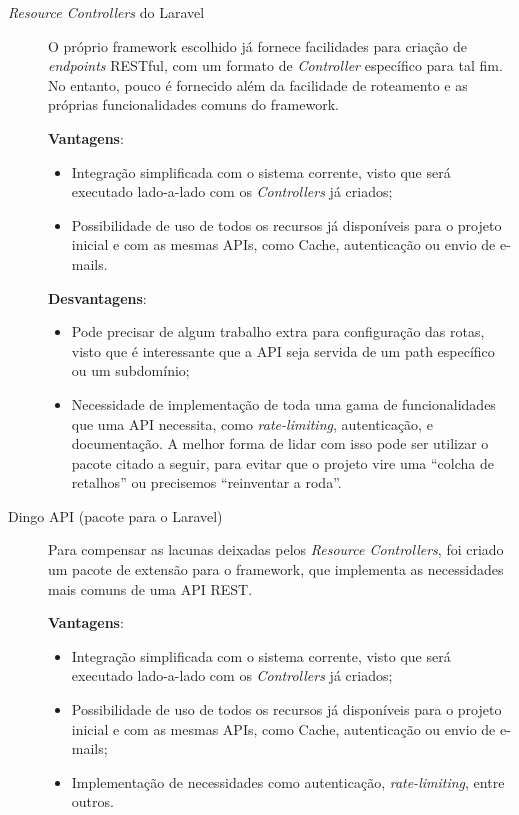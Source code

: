 \documentclass[12pt,a4paper,twoside,hyphens,english,brazil]{abntex2}
\begin{document}
{\begin{description}
	\item[\emph{Resource Controllers} do Laravel]
		O próprio framework escolhido já fornece facilidades para criação de \emph{endpoints} RESTful, com um formato de \emph{Controller} específico para tal fim. No entanto, pouco é fornecido além da facilidade de roteamento e as próprias funcionalidades comuns do framework.
		
		\textbf{Vantagens}:
		\begin{itemize}[itemsep=-1ex]
			\item Integração simplificada com o sistema corrente, visto que será executado lado-a-lado com os \emph{Controllers} já criados;
			\item Possibilidade de uso de todos os recursos já disponíveis para o projeto inicial e com as mesmas APIs, como Cache, autenticação ou envio de e-mails.
		\end{itemize}
			
		\textbf{Desvantagens}:
		\begin{itemize}[itemsep=-1ex]
			\item Pode precisar de algum trabalho extra para configuração das rotas, visto que é interessante que a API seja servida de um path específico ou um subdomínio;
			\item Necessidade de implementação de toda uma gama de funcionalidades que uma API necessita, como \emph{rate-limiting}, autenticação, e documentação. A melhor forma de lidar com isso pode ser utilizar o pacote citado a seguir, para evitar que o projeto vire uma ``colcha de retalhos'' ou precisemos ``reinventar a roda''.
		\end{itemize}
	
	\item[Dingo API (pacote para o Laravel)]
		Para compensar as lacunas deixadas pelos \emph{Resource Controllers}, foi criado um pacote de extensão para o framework, que implementa as necessidades mais comuns de uma API REST.
	
		\textbf{Vantagens}:
		\begin{itemize}[itemsep=-1ex]
			\item Integração simplificada com o sistema corrente, visto que será executado lado-a-lado com os \emph{Controllers} já criados;
			\item Possibilidade de uso de todos os recursos já disponíveis para o projeto inicial e com as mesmas APIs, como Cache, autenticação ou envio de e-mails;
			\item Implementação de necessidades como autenticação, \emph{rate-limiting}, entre outros.
		\end{itemize}
				

\end{description}}
\end{document}
